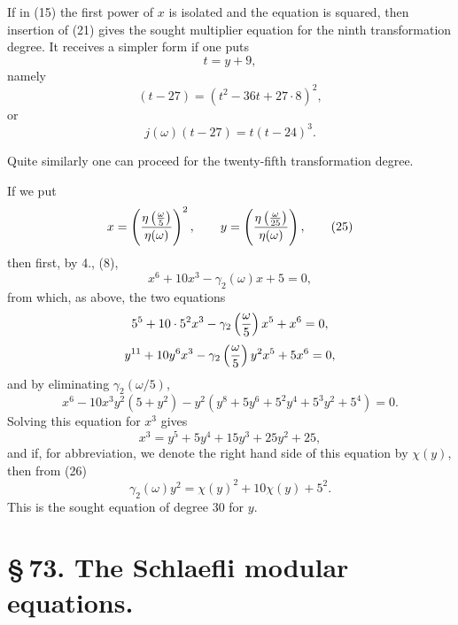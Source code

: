 \documentclass[11pt]{article}
\begin{document}
If in (15) the first power of $x$ is isolated and the equation is squared, then insertion of (21) gives the sought multiplier equation for the ninth transformation degree. It receives a simpler form if one puts
\begin{equation}
 t=y+9,
\tag{22}
\end{equation}
namely
\begin{equation}
 [j(\omega)-27\cdot64](t-27)=(t^2-36t+27\cdot8)^2,
\tag{23}
\end{equation}
or
\begin{equation}
 j(\omega)(t-27)=t(t-24)^3.
\tag{24}
\end{equation}

Quite similarly one can proceed for the twenty-fifth transformation degree.

If we put
\begin{equation}
 x=\left({\eta\left({\omega\over5}\right)\over\eta(\omega)}\right)^2,
 \qquad
 y=\left({\eta\left({\omega\over25}\right)\over\eta(\omega)}\right),
\tag{25}
\end{equation}
then first, by 4., (8),
\begin{equation}
 x^6+10x^3-\gamma_2(\omega)x+5=0,
\tag{26}
\end{equation}
from which, as above, the two equations
\[
 5^5+10\cdot5^2x^3-\gamma_2\left({\omega\over5}\right)x^5+x^6=0,
\]
\[
 y^{11}+10y^6x^3-\gamma_2\left({\omega\over5}\right)y^2x^5+5x^6=0,
\]
and by eliminating $\gamma_2(\omega/5)$,
\[
 x^6-10x^3y^2(5+y^2)-y^2(y^8+5y^6+5^2y^4+5^3y^2+5^4)=0.
\]
Solving this equation for $x^3$ gives
\begin{equation}
 x^3=y^5+5y^4+15y^3+25y^2+25,
\tag{27}
\end{equation}
and if, for abbreviation, we denote the right hand side of this equation by $\chi(y)$, then from (26)
\begin{equation}
 \gamma_2(\omega)y^2=\chi(y)^2+10\chi(y)+5^2.
\tag{28}
\end{equation}
This is the sought equation of degree $30$ for $y$.


\clearpage
\section*{\S\,73. The Schlaefli modular equations.}
\end{document}

